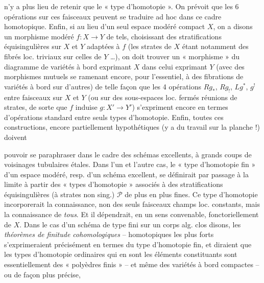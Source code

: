 \documentclass[11pt,a4paper]{article}
\begin{document}
n'y a plus lieu de retenir que le « type d'homotopie ». On prévoit que les 6 opérations sur ces faisceaux peuvent se traduire ad hoc dans ce cadre homotopique. Enfin, si au lieu d'un seul espace modéré compact $X$, on a disons un morphisme modéré $f : X \to Y$ de tels, choisissant des stratifications équisingulières sur $X$ et $Y$ adaptées à $f$ (les strates de $X$ étant notamment des fibrés loc. triviaux sur celles de $Y$ …), on doit trouver un « morphisme » du diagramme de variétés à bord exprimant $X$ dans celui exprimant $Y$ (avec des morphismes mutuels se ramenant encore, pour l'essentiel, à des fibrations de variétés à bord sur d'autres) de telle façon que les 4 opérations $Rg_*$, $Rg_!$, $Lg^*$, $g^!$ entre faisceaux  sur $X$ et $Y$ (ou sur des sous-espaces  loc. fermés réunions de strates, de sorte que $f$ induise $g : X' \to Y'$) s'expriment encore en termes d'opérations standard entre seuls types d'homotopie. Enfin, toutes ces constructions, encore partiellement hypothétiques (y a du travail  sur la planche !) doivent

pouvoir se paraphraser dans le cadre des schémas excellents, à grands coups de voisinages tubulaires étales. Dans l'un et l'autre cas, le « type d'homotopie fin » d'un espace modéré, resp. d'un schéma excellent, se définirait par passage à la limite à partir des « types d'homotopie » associés à des stratifications équisingulières (à strates non sing.) $\mathcal{P}$ de plus en plus fines. Ce type d'homotopie  incorporerait la connaissance, non des seuls faisceaux champs loc. constants, mais  la connaissance de \emph{tous}. Et il dépendrait, en un sens convenable, fonctoriellement de $X$. Dans le cas d'un schéma de type fini sur un corps alg. clos disons, les \emph{théorèmes de finitude cohomologiques} -- homotopiques les plus forts s'exprimeraient précisément en termes du type d'homotopie fin, et diraient que les types d'homotopie ordinaires qui en sont les éléments constituants sont essentiellement des « polyèdres finis » -- et même des variétés à bord compactes -- ou de façon plus précise,
\end{document}
